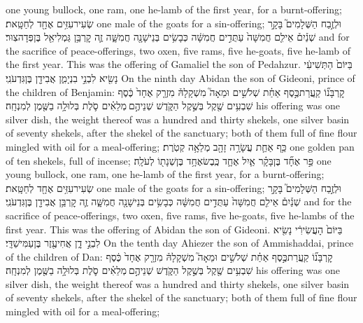 \documentclass[11pt, openany]{book}
\begin{document}
{one young bullock, one ram, one he-lamb of the first year, for a burnt-offering;}
{שְׂעִיר\maqqaf עִזִּ֥ים אֶחָ֖ד לְחַטָּֽאת׃}
{one male of the goats for a sin-offering;}
{וּלְזֶ֣בַח הַשְּׁלָמִים֮ בָּקָ֣ר שְׁנַ֒יִם֒ אֵילִ֤ם חֲמִשָּׁה֙ עַתֻּדִ֣ים חֲמִשָּׁ֔ה כְּבָשִׂ֥ים בְּנֵי\maqqaf שָׁנָ֖ה חֲמִשָּׁ֑ה זֶ֛ה קׇרְבַּ֥ן גַּמְלִיאֵ֖ל בֶּן\maqqaf פְּדָהצֽוּר׃ \petucha }
{and for the sacrifice of peace-offerings, two oxen, five rams, five he-goats, five he-lamb of the first year. This was the offering of Gamaliel the son of Pedahzur.}
{בַּיּוֹם֙ הַתְּשִׁיעִ֔י נָשִׂ֖יא לִבְנֵ֣י בִנְיָמִ֑ן אֲבִידָ֖ן בֶּן\maqqaf גִּדְעֹנִֽי׃}
{On the ninth day Abidan the son of Gideoni, prince of the children of Benjamin:}
{קׇרְבָּנ֞וֹ קַֽעֲרַת\maqqaf כֶּ֣סֶף אַחַ֗ת שְׁלֹשִׁ֣ים וּמֵאָה֮ מִשְׁקָלָהּ֒ מִזְרָ֤ק אֶחָד֙ כֶּ֔סֶף שִׁבְעִ֥ים שֶׁ֖קֶל בְּשֶׁ֣קֶל הַקֹּ֑דֶשׁ שְׁנֵיהֶ֣ם \legarmeh  מְלֵאִ֗ים סֹ֛לֶת בְּלוּלָ֥ה בַשֶּׁ֖מֶן לְמִנְחָֽה׃}
{his offering was one silver dish, the weight thereof was a hundred and thirty shekels, one silver basin of seventy shekels, after the shekel of the sanctuary; both of them full of fine flour mingled with oil for a meal-offering;}
{כַּ֥ף אַחַ֛ת עֲשָׂרָ֥ה זָהָ֖ב מְלֵאָ֥ה קְטֹֽרֶת׃}
{one golden pan of ten shekels, full of incense;}
{פַּ֣ר אֶחָ֞ד בֶּן\maqqaf בָּקָ֗ר אַ֧יִל אֶחָ֛ד כֶּֽבֶשׂ\maqqaf אֶחָ֥ד בֶּן\maqqaf שְׁנָת֖וֹ לְעֹלָֽה׃}
{one young bullock, one ram, one he-lamb of the first year, for a burnt-offering;}
{שְׂעִיר\maqqaf עִזִּ֥ים אֶחָ֖ד לְחַטָּֽאת׃}
{one male of the goats for a sin-offering;}
{וּלְזֶ֣בַח הַשְּׁלָמִים֮ בָּקָ֣ר שְׁנַ֒יִם֒ אֵילִ֤ם חֲמִשָּׁה֙ עַתֻּדִ֣ים חֲמִשָּׁ֔ה כְּבָשִׂ֥ים בְּנֵי\maqqaf שָׁנָ֖ה חֲמִשָּׁ֑ה זֶ֛ה קׇרְבַּ֥ן אֲבִידָ֖ן בֶּן\maqqaf גִּדְעֹנִֽי׃ \petucha }
{and for the sacrifice of peace-offerings, two oxen, five rams, five he-goats, five he-lambs of the first year. This was the offering of Abidan the son of Gideoni.}
{בַּיּוֹם֙ הָעֲשִׂירִ֔י נָשִׂ֖יא לִבְנֵ֣י דָ֑ן אֲחִיעֶ֖זֶר בֶּן\maqqaf עַמִּישַׁדָּֽי׃}
{On the tenth day Ahiezer the son of Ammishaddai, prince of the children of Dan:}
{קׇרְבָּנ֞וֹ קַֽעֲרַת\maqqaf כֶּ֣סֶף אַחַ֗ת שְׁלֹשִׁ֣ים וּמֵאָה֮ מִשְׁקָלָהּ֒ מִזְרָ֤ק אֶחָד֙ כֶּ֔סֶף שִׁבְעִ֥ים שֶׁ֖קֶל בְּשֶׁ֣קֶל הַקֹּ֑דֶשׁ שְׁנֵיהֶ֣ם \legarmeh  מְלֵאִ֗ים סֹ֛לֶת בְּלוּלָ֥ה בַשֶּׁ֖מֶן לְמִנְחָֽה׃}
{his offering was one silver dish, the weight thereof was a hundred and thirty shekels, one silver basin of seventy shekels, after the shekel of the sanctuary; both of them full of fine flour mingled with oil for a meal-offering;}
\end{document}
